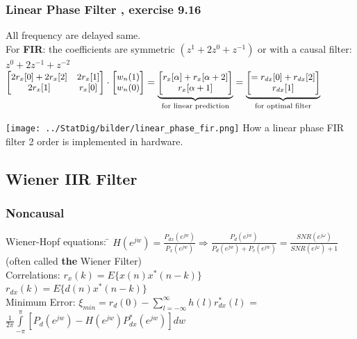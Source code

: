 \begin{minipage}{11.5cm}
\subsubsection{Linear Phase Filter , exercise 9.16} 
All frequency are delayed same. \\
For \textbf{FIR}: the coefficients are symmetric $(z^1+2z^0+z^{-1})$ or with a causal filter: $z^0 + 2z^{-1} + z^{-2}$\\
$\small \begin{bmatrix}
2 r_x[0] + 2 r_x[2]		&	2 r_x[1] \\
2 r_x[1]				& 	r_x[0]
\end{bmatrix} \cdot \begin{bmatrix}
w_n(1)\\
w_n(0)
\end{bmatrix}= \underbrace{ \begin{bmatrix}
r_x[\alpha] + r_x[\alpha+2]\\
r_x[\alpha+1]
\end{bmatrix}}_{\text{for linear prediction} } 
= \underbrace{ \begin{bmatrix} = 
r_{dx}[0] + r_{dx}[2]\\
r_{dx}[1]
\end{bmatrix}    }_{\text{for optimal filter} }  $

\end{minipage}
\hspace{3mm}
\begin{minipage}{7cm}
\texttt{[image: ../StatDig/bilder/linear\_phase\_fir.png]}
How a linear phase FIR filter 2 order is implemented in hardware.
\end{minipage}
\subsection{Wiener IIR Filter}
\begin{minipage}{8cm}
\subsubsection{Noncausal }
\begin{tabbing}
Wiener-Hopf equations: \=
$H(e^{jw})=\frac{P_{dx}(e^{jw})}{P_{x}(e^{jw})}  \Rightarrow
\frac{P_{d}(e^{jw})}{P_{d}(e^{jw}) + P_{v}(e^{jw})}= \frac{SNR(e^{j\omega})}{SNR(e^{j\omega}) + 1}$ (often called \textbf{the} Wiener Filter) \\

Correlations: \>
	$r_x(k) =E \{ x(n)x^{*}(n-k) \} $\\ 
	\>$r_{dx}(k) =E\{d(n)x^{*}(n-k)\}$\\


Minimum Error:\>
	$\xi_{min} =r_d(0)-\sum \limits_{l=-\infty}^\infty h(l)r_{dx}^{*}(l)$
	=$\frac{1}{2\pi}\int \limits_{-\pi}^\pi[P_d(e^{jw})-H(e^{jw})P_{dx}^{*}(e^{jw})]dw$
\end{tabbing}

\end{minipage}

